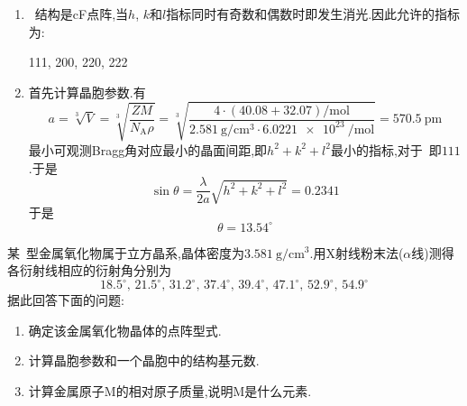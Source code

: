 \documentclass{ctexart}
\begin{document}
\begin{solution}
    \begin{enumerate}[label=\tbf{(\alph*)}]
        \item ~结构是cF点阵,当$h$, $k$和$l$指标同时有奇数和偶数时即发生消光.因此允许的指标为:\begin{center}
            111, 200, 220, 222
        \end{center}
        \item 首先计算晶胞参数.有
        \[a=\sqrt[3]{V}=\sqrt[3]{\dfrac{ZM}{N_{\text{A}}\rho}}=\sqrt[3]{\dfrac{4\cdot(40.08+32.07)\si{\per\mole}}{\SI{2.581}{\gram\per\centi\meter^3}\cdot\SI{6.0221e23}{\per\mole}}}=\SI{570.5}{\pico\meter}\]
        最小可观测Bragg角对应最小的晶面间距,即$h^2+k^2+l^2$最小的指标,对于~即$111$.于是
        \[\sin\theta=\dfrac{\lambda}{2a}\sqrt{h^2+k^2+l^2}=0.2341\]
        于是
        \[\theta=13.54^\circ\]
    \end{enumerate}
\end{solution}
\begin{homework}[13.]
    某~型金属氧化物属于立方晶系,晶体密度为$\SI{3.581}{\gram\per\centi\meter^3}$.用X射线粉末法($\alpha$线)测得各衍射线相应的衍射角分别为
    \[18.5^\circ,\,21.5^\circ,\,31.2^\circ,\,37.4^\circ,\,39.4^\circ,\,47.1^\circ,\,52.9^\circ,\,54.9^\circ\]
    据此回答下面的问题:
    \begin{enumerate}[label=\tbf{(\alph*)}]
        \item 确定该金属氧化物晶体的点阵型式.
        \item 计算晶胞参数和一个晶胞中的结构基元数.
        \item 计算金属原子M的相对原子质量,说明M是什么元素.
    \end{enumerate}
\end{homework}
\end{document}
